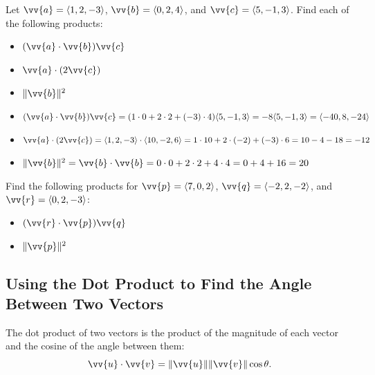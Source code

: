 \documentclass{article}
\begin{document}
\begin{examplebox}
    Let \(\vv{a} = \langle 1, 2, -3 \rangle\), \(\vv{b} = \langle 0, 2, 4 \rangle\), and \(\vv{c} = \langle 5, -1, 3 \rangle\). Find each of the following products:
    \begin{itemize}
        \item \((\vv{a} \cdot \vv{b}) \vv{c}\)
        \item \(\vv{a} \cdot (2\vv{c})\)
        \item \(\|\vv{b}\|^2\)
    \end{itemize}

    \begin{solutionbox}
        \begin{itemize}
            \item \((\vv{a} \cdot \vv{b}) \vv{c} = (1 \cdot 0 + 2 \cdot 2 + (-3) \cdot 4) \langle 5, -1, 3 \rangle = -8 \langle 5, -1, 3 \rangle = \langle -40, 8, -24 \rangle\)
            \item \(\vv{a} \cdot (2\vv{c}) = \langle 1, 2, -3 \rangle \cdot \langle 10, -2, 6 \rangle = 1 \cdot 10 + 2 \cdot (-2) + (-3) \cdot 6 = 10 - 4 - 18 = -12\)
            \item \(\|\vv{b}\|^2 = \vv{b} \cdot \vv{b} = 0 \cdot 0 + 2 \cdot 2 + 4 \cdot 4 = 0 + 4 + 16 = 20\)
        \end{itemize}
    \end{solutionbox}
\end{examplebox}

\begin{exercisebox}
    Find the following products for \(\vv{p} = \langle 7, 0, 2 \rangle\), \(\vv{q} = \langle -2, 2, -2 \rangle\), and \(\vv{r} = \langle 0, 2, -3 \rangle\):
    \begin{itemize}
        \item \((\vv{r} \cdot \vv{p}) \vv{q}\)
        \item \(\|\vv{p}\|^2\)
    \end{itemize}
\end{exercisebox}

\subsection*{Using the Dot Product to Find the Angle Between Two Vectors}

\begin{theorembox}
    The dot product of two vectors is the product of the magnitude of each vector and the cosine of the angle between them:
    \[
    \vv{u} \cdot \vv{v} = \|\vv{u}\| \|\vv{v}\| \cos \theta.
    \]
\end{theorembox}
\end{document}
